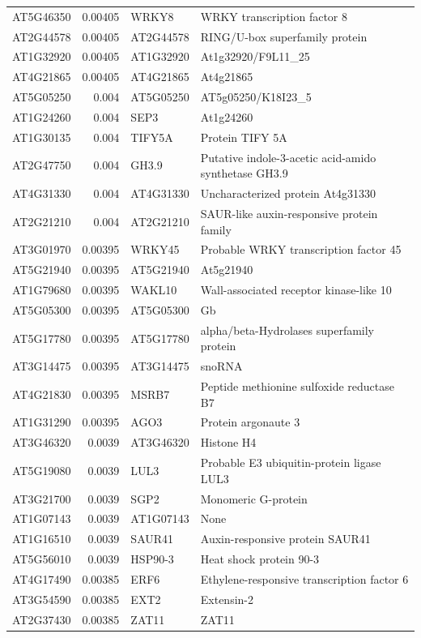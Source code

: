 \documentclass[11pt]{article}
\begin{document}
\begin{center}
\begin{tabular}{lrll}
AT5G46350 & 0.00405 & WRKY8 & WRKY transcription factor 8\\
AT2G44578 & 0.00405 & AT2G44578 & RING/U-box superfamily protein\\
AT1G32920 & 0.00405 & AT1G32920 & At1g32920/F9L11\_25\\
AT4G21865 & 0.00405 & AT4G21865 & At4g21865\\
AT5G05250 & 0.004 & AT5G05250 & AT5g05250/K18I23\_5\\
AT1G24260 & 0.004 & SEP3 & At1g24260\\
AT1G30135 & 0.004 & TIFY5A & Protein TIFY 5A\\
AT2G47750 & 0.004 & GH3.9 & Putative indole-3-acetic acid-amido synthetase GH3.9\\
AT4G31330 & 0.004 & AT4G31330 & Uncharacterized protein At4g31330\\
AT2G21210 & 0.004 & AT2G21210 & SAUR-like auxin-responsive protein family\\
AT3G01970 & 0.00395 & WRKY45 & Probable WRKY transcription factor 45\\
AT5G21940 & 0.00395 & AT5G21940 & At5g21940\\
AT1G79680 & 0.00395 & WAKL10 & Wall-associated receptor kinase-like 10\\
AT5G05300 & 0.00395 & AT5G05300 & Gb\\
AT5G17780 & 0.00395 & AT5G17780 & alpha/beta-Hydrolases superfamily protein\\
AT3G14475 & 0.00395 & AT3G14475 & snoRNA\\
AT4G21830 & 0.00395 & MSRB7 & Peptide methionine sulfoxide reductase B7\\
AT1G31290 & 0.00395 & AGO3 & Protein argonaute 3\\
AT3G46320 & 0.0039 & AT3G46320 & Histone H4\\
AT5G19080 & 0.0039 & LUL3 & Probable E3 ubiquitin-protein ligase LUL3\\
AT3G21700 & 0.0039 & SGP2 & Monomeric G-protein\\
AT1G07143 & 0.0039 & AT1G07143 & None\\
AT1G16510 & 0.0039 & SAUR41 & Auxin-responsive protein SAUR41\\
AT5G56010 & 0.0039 & HSP90-3 & Heat shock protein 90-3\\
AT4G17490 & 0.00385 & ERF6 & Ethylene-responsive transcription factor 6\\
AT3G54590 & 0.00385 & EXT2 & Extensin-2\\
AT2G37430 & 0.00385 & ZAT11 & ZAT11\\

\end{tabular}
\end{center}
\end{document}
